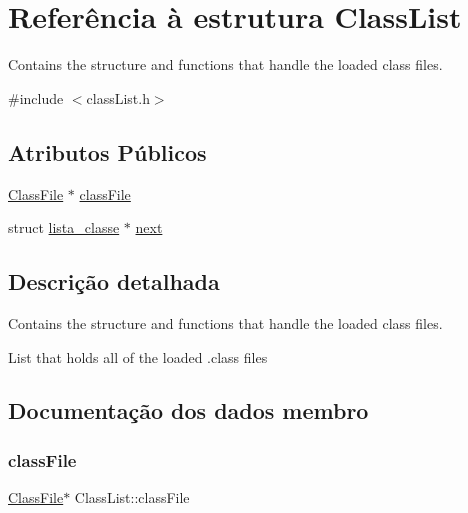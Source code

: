 \hypertarget{struct_class_list}{}\section{Referência à estrutura Class\+List}
\label{struct_class_list}


Contains the structure and functions that handle the loaded class files.  




{\ttfamily \#include $<$class\+List.\+h$>$}

\subsection*{Atributos Públicos}
\begin{DoxyCompactItemize}
\item 
\hyperlink{struct_class_file}{Class\+File} $\ast$ \hyperlink{struct_class_list_a1ccb3a71490dce0f2aea6693e86c7fad}{class\+File}
\item 
struct \hyperlink{class_list_8h_abd6e86b261bfff4b12ad1311d1e16e96}{lista\+\_\+classe} $\ast$ \hyperlink{struct_class_list_ac393dfc0073ba3cb5556d533d2669986}{next}
\end{DoxyCompactItemize}


\subsection{Descrição detalhada}
Contains the structure and functions that handle the loaded class files. 

List that holds all of the loaded .class files 

\subsection{Documentação dos dados membro}
\mbox{\label{struct_class_list_a1ccb3a71490dce0f2aea6693e86c7fad}} 
\subsubsection{\texorpdfstring{class\+File}{classFile}}
{\footnotesize\ttfamily \hyperlink{struct_class_file}{Class\+File}$\ast$ Class\+List\+::class\+File}

\mbox{\label{struct_class_list_ac393dfc0073ba3cb5556d533d2669986}} 
